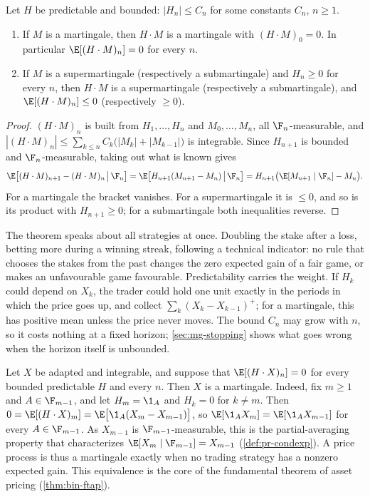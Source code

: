 \begin{theorem}\label{thm:mg-transform}
Let $H$ be predictable and bounded: $|H_n|\le C_n$ for some constants $C_n$, $n\ge1$.
\begin{enumerate}[label=(\roman*)]
  \item If $M$ is a martingale, then $H\cdot M$ is a martingale with $(H\cdot M)_0=0$. In
    particular $\E[(H\cdot M)_n]=0$ for every $n$.
  \item If $M$ is a supermartingale (respectively a submartingale) and $H_n\ge0$ for every
    $n$, then $H\cdot M$ is a supermartingale (respectively a submartingale), and
    $\E[(H\cdot M)_n]\le0$ (respectively $\ge0$).
\end{enumerate}
\end{theorem}

\begin{proof}
$(H\cdot M)_n$ is built from $H_1,\dots,H_n$ and $M_0,\dots,M_n$, all $\F_n$-measurable, and
$|(H\cdot M)_n|\le\sum_{k\le n}C_k\big(|M_k|+|M_{k-1}|\big)$ is integrable. Since $H_{n+1}$ is
bounded and $\F_n$-measurable, taking out what is known gives
\[
  \E\big[(H\cdot M)_{n+1}-(H\cdot M)_n\,\big|\,\F_n\big]
  =\E\big[H_{n+1}(M_{n+1}-M_n)\,\big|\,\F_n\big]
  =H_{n+1}\big(\E[M_{n+1}\mid\F_n]-M_n\big).
\]
For a martingale the bracket vanishes. For a supermartingale it is $\le0$, and so is its
product with $H_{n+1}\ge0$; for a submartingale both inequalities reverse.
\end{proof}

The theorem speaks about all strategies at once. Doubling the stake after a loss, betting more
during a winning streak, following a technical indicator: no rule that chooses the stakes
from the past changes the zero expected gain of a fair game, or makes an unfavourable game
favourable. Predictability carries the weight. If $H_k$ could depend on $X_k$, the trader
could hold one unit exactly in the periods in which the price goes up, and collect
$\sum_k(X_k-X_{k-1})^+$; for a martingale, this has positive mean unless the price never
moves. The bound $C_n$ may
grow with $n$, so it costs nothing at a fixed horizon; \cref{sec:mg-stopping} shows what goes
wrong when the horizon itself is unbounded.

\begin{remark}[A converse]\label{rem:mg-converse}
Let $X$ be adapted and integrable, and suppose that $\E[(H\cdot X)_n]=0$ for every bounded
predictable $H$ and every $n$. Then $X$ is a martingale. Indeed, fix $m\ge1$ and
$A\in\F_{m-1}$, and let $H_m=\1_A$ and $H_k=0$ for $k\ne m$. Then
$0=\E[(H\cdot X)_m]=\E\big[\1_A(X_m-X_{m-1})\big]$, so $\E[\1_AX_m]=\E[\1_AX_{m-1}]$ for every
$A\in\F_{m-1}$. As $X_{m-1}$ is $\F_{m-1}$-measurable, this is the partial-averaging property
that characterizes $\E[X_m\mid\F_{m-1}]=X_{m-1}$ (\cref{def:pr-condexp}). A price process is
thus a martingale exactly when no trading strategy has a nonzero expected gain. This
equivalence is the core of the fundamental theorem of asset pricing (\cref{thm:bin-ftap}).
\end{remark}

